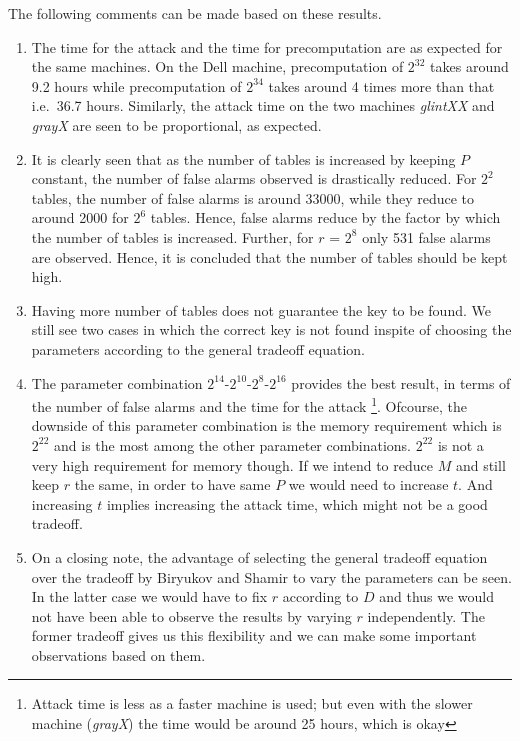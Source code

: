 The following comments can be made based on these results.
\begin{enumerate}
\item The time for the attack and the time for precomputation are as expected for the same machines. On the Dell machine, precomputation of $2^{32}$ takes around 9.2 hours while precomputation of $2^{34}$ takes around 4 times more than that i.e.~36.7 hours. Similarly, the attack time on the two machines \textit{glintXX} and \textit{grayX} are seen to be proportional, as expected.

\item It is clearly seen that as the number of tables is increased by keeping $P$ constant, the number of false alarms observed is drastically reduced. For $2^{2}$ tables, the number of false alarms is around 33000, while they reduce to around 2000 for $2^{6}$ tables. Hence, false alarms reduce by the factor by which the number of tables is increased. Further, for $r$ = $2^{8}$ only 531 false alarms are observed. Hence, it is concluded that the number of tables should be kept high.

\item Having more number of tables does not guarantee the key to be found. We still see two cases in which the correct key is not found inspite of choosing the parameters according to the general tradeoff equation.

\item The parameter combination $2^{14}$-$2^{10}$-$2^{8}$-$2^{16}$ provides the best result, in terms of the number of false alarms and the time for the attack \footnote{Attack time is less as a faster machine is used; but even with the slower machine (\textit{grayX}) the time would be around 25 hours, which is okay}. Ofcourse, the downside of this parameter combination is the memory requirement which is $2^{22}$ and is the most among the other parameter combinations. $2^{22}$ is not a very high requirement for memory though. If we intend to reduce $M$ and still keep $r$ the same, in order to have same $P$ we would need to increase $t$. And increasing $t$ implies increasing the attack time, which might not be a good tradeoff. 

\item On a closing note, the advantage of selecting the general tradeoff equation over the tradeoff by Biryukov and Shamir to vary the parameters can be seen. In the latter case we would have to fix $r$ according to $D$ and thus we would not have been able to observe the results by varying $r$ independently. The former tradeoff gives us this flexibility and we can make some important observations based on them. 
\end{enumerate}